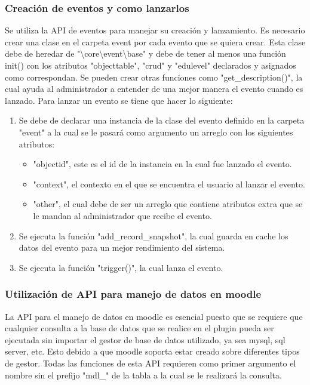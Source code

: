   \subsubsection{Creación de eventos y como lanzarlos}

			Se utiliza la API de eventos para manejar su creación y lanzamiento. Es necesario crear una clase en el carpeta event por cada evento que se quiera crear. Esta clase debe de heredar de "\textbackslash core\textbackslash event\textbackslash base" y debe de tener al menos una función init() con los atributos "objecttable", "crud" y "edulevel" declarados y asignados como correspondan.
			Se pueden crear otras funciones como "get\_description()", la cual ayuda al administrador a entender de una mejor manera el evento cuando es lanzado.
			Para lanzar un evento se tiene que hacer lo siguiente:

      \begin{enumerate}



				\item Se debe de declarar una instancia de la clase del evento definido en la carpeta "event" a la cual se le pasará como argumento un arreglo con los siguientes atributos:
        \begin{itemize}
          \item "objectid", este es el id de la instancia en la cual fue lanzado el evento.
          \item "context", el contexto en el que se encuentra el usuario al lanzar el evento.
          \item "other", el cual debe de ser un arreglo que contiene atributos extra que se le mandan al administrador que recibe el evento.
        \end{itemize}


				\item Se ejecuta la función "add\_record\_snapshot", la cual guarda en cache los datos del evento para un mejor rendimiento del sistema.
				\item Se ejecuta la función "trigger()", la cual lanza el evento.

      \end{enumerate}

  \subsubsection{Utilización de API para manejo de datos en moodle}

		La API para el manejo de datos en moodle es esencial puesto que se requiere que cualquier consulta a la base de datos que se realice en el plugin pueda ser ejecutada sin importar el gestor de base de datos utilizado, ya sea mysql, sql server, etc. Esto debido a que moodle soporta estar creado sobre diferentes tipos de gestor.
		Todas las funciones de esta API requieren como primer argumento el nombre sin el prefijo "mdl\_" de la tabla a la cual se le realizará la consulta.

